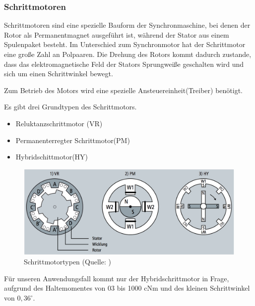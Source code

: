 \renewcommand{\autoren}{Severin Schendel	}
\newpage

\subsubsection{Schrittmotoren}

Schrittmotoren sind eine spezielle Bauform der Synchronmaschine, bei denen der Rotor als Permanentmagnet ausgeführt ist, während der Stator aus einem Spulenpaket besteht. Im Unterschied zum Synchronmotor hat der Schrittmotor eine große Zahl an Polpaaren. Die Drehung des Rotors kommt dadurch zustande, dass das elektromagnetische Feld der Stators Sprungweiße geschalten wird und sich um einen Schrittwinkel bewegt.

Zum Betrieb des Motors wird eine spezielle Ansteuereinheit(Treiber) benötigt.


Es gibt drei Grundtypen des Schrittmotors.

\begin{itemize}
	\item Reluktanzschrittmotor (VR)
	\item Permanenterregter Schrittmotor(PM)
	\item Hybridschittmotor(HY)
\end{itemize}

\begin{figure}[h]  %
\centering\includegraphics[width=1.0\textwidth]{images/Schrittmotortypen.png}
\caption{Schrittmotortypen \newline (Quelle: \cite{roboterKS_Bild})}
\label{robotKSys}
\end{figure}

Für unseren Anwendungsfall kommt nur der Hybridschrittmotor in Frage, aufgrund des Haltemomentes von 03 bis 1000 cNm und des kleinen Schrittwinkel von $0,36^\circ$.

